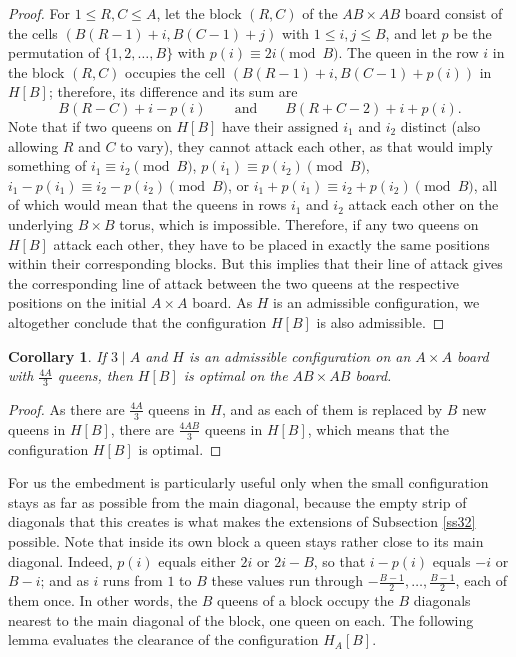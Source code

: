 \documentclass[10pt,a4paper]{article}
\newtheorem{corollary}[theorem]{Corollary}
\theoremstyle{definition}
\begin{document}
\begin{proof}
For $1\leqslant R,C\leqslant A$, let the block
$(R,C)$ of the $AB\times AB$ board consist of the cells
$(B(R-1)+i,B(C-1)+j)$ with $1\leqslant i,j\leqslant B$, and let $p$ be the
permutation of $\{1,2,\dots,B\}$ with $p(i)\equiv2i\pmod B$. The queen in the row $i$ in the block $(R,C)$ occupies the cell
$(B(R-1)+i,B(C-1)+p(i))$ in $H[B]$; therefore, its difference and its sum are
\[
B(R-C)+i-p(i)\qquad\text{and}\qquad B(R+C-2)+i+p(i).
\]
Note that if two queens on $H[B]$ have their assigned $i_1$ and $i_2$ distinct (also allowing $R$ and $C$ to vary), they cannot attack each other, as that would imply something of $i_1\equiv i_2\pmod B$, $p(i_1)\equiv p(i_2)\pmod B$, $i_1-p(i_1)\equiv i_2-p(i_2)\pmod B$, or $i_1+p(i_1)\equiv i_2+p(i_2)\pmod B$, all of which would mean that the queens in rows $i_1$ and $i_2$ attack each other on the underlying $B\times B$ torus, which is impossible. Therefore, if any two queens on $H[B]$ attack each other, they have to be placed in exactly the same positions within their corresponding blocks. But this implies that their line of attack gives the corresponding line of attack between the two queens at the respective positions on the initial $A\times A$ board. As  $H$ is an admissible configuration, we altogether conclude that the configuration $H[B]$ is also admissible.
\end{proof}

\begin{corollary}
\label{substopt}
If $3\mid A$ and $H$ is an admissible configuration on an $A\times A$ board with $\frac{4A}3$ queens, then $H[B]$ is
optimal on the $AB\times AB$ board.
\end{corollary}

\begin{proof}
As there are $\frac{4A}3$ queens in $H$, and as each of them is replaced by $B$ new queens in $H[B]$, there are $\frac{4AB}3$ queens in $H[B]$, which means that the configuration $H[B]$ is optimal.
\end{proof}

For us the embedment is particularly useful only when the small configuration stays as far as possible from the main diagonal, because the empty strip of diagonals that this creates
is what makes the extensions of Subsection \ref{ss32} possible. Note that inside its own block a queen stays rather close to its main
diagonal. Indeed, $p(i)$ equals either $2i$ or $2i-B$, so that $i-p(i)$ equals
$-i$ or $B-i$; and as $i$ runs from $1$ to $B$ these values run through
$-\frac{B-1}2,\dots,\frac{B-1}2$, each of them once. In other words, the $B$
queens of a block occupy the $B$ diagonals nearest to the main diagonal of the
block, one queen on each. The following lemma evaluates the clearance of the configuration $H_A[B]$.
\end{document}
